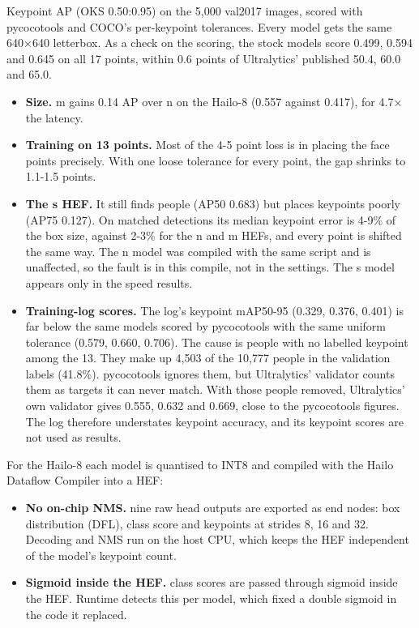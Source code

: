 Keypoint AP (OKS 0.50:0.95) on the 5,000 val2017 images, scored with pycocotools \cite{b15} and COCO's per-keypoint tolerances. Every model gets the same 640×640 letterbox. As a check on the scoring, the stock models score 0.499, 0.594 and 0.645 on all 17 points, within 0.6 points of Ultralytics' published 50.4, 60.0 and 65.0.

\begin{itemize}
\tightlist
\item
  \textbf{Size.} m gains 0.14 AP over n on the Hailo-8 (0.557 against 0.417), for 4.7× the latency.
\item
  \textbf{Training on 13 points.} Most of the 4-5 point loss is in placing the face points precisely. With one loose tolerance for every point, the gap shrinks to 1.1-1.5 points.
\item
  \textbf{The s HEF.} It still finds people (AP50 0.683) but places keypoints poorly (AP75 0.127). On matched detections its median keypoint error is 4-9\% of the box size, against 2-3\% for the n and m HEFs, and every point is shifted the same way. The n model was compiled with the same script and is unaffected, so the fault is in this compile, not in the settings. The s model appears only in the speed results.
\item
  \textbf{Training-log scores.} The log's keypoint mAP50-95 (0.329, 0.376, 0.401) is far below the same models scored by pycocotools with the same uniform tolerance (0.579, 0.660, 0.706). The cause is people with no labelled keypoint among the 13. They make up 4,503 of the 10,777 people in the validation labels (41.8\%). pycocotools ignores them, but Ultralytics' validator counts them as targets it can never match. With those people removed, Ultralytics' own validator gives 0.555, 0.632 and 0.669, close to the pycocotools figures. The log therefore understates keypoint accuracy, and its keypoint scores are not used as results.
\end{itemize}

For the Hailo-8 each model is quantised to INT8 and compiled with the Hailo Dataflow Compiler into a HEF:

\begin{itemize}
\tightlist
\item
  \textbf{No on-chip NMS.} nine raw head outputs are exported as end nodes: box distribution (DFL), class score and keypoints at strides 8, 16 and 32. Decoding and NMS run on the host CPU, which keeps the HEF independent of the model's keypoint count.
\item
  \textbf{Sigmoid inside the HEF.} class scores are passed through sigmoid inside the HEF. Runtime detects this per model, which fixed a double sigmoid in the code it replaced.
\end{itemize}

